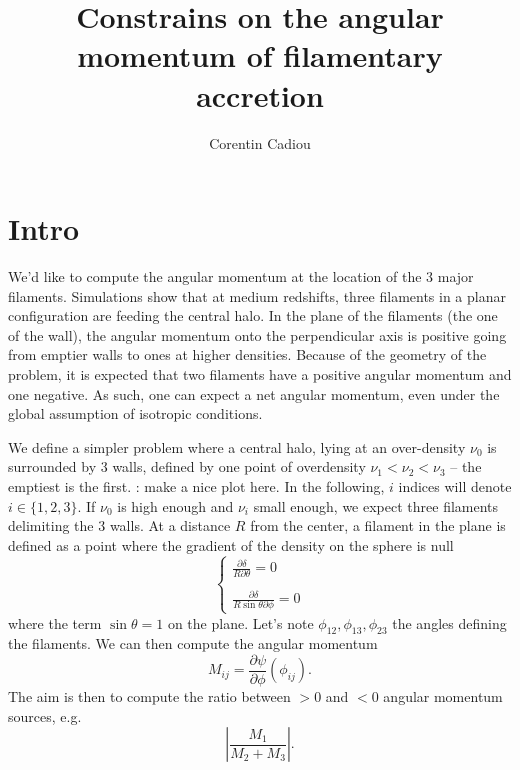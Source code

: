 \documentclass[useAMS,usenatbib,babel,superscriptaddress]{mnras}
\title{Constrains on the angular momentum of filamentary accretion}
\author{Corentin Cadiou}
\def\red{\color{Red}}
\newcommand{\TODO}[1]{{\red{\bf TODO}: #1}}
\begin{document}
\maketitle

\section{Intro}
\label{sec:intro}

We'd like to compute the angular momentum at the location of the 3 major filaments. Simulations show that at medium redshifts, three filaments in a planar configuration are feeding the central halo. In the plane of the filaments (the one of the wall), the angular momentum onto the perpendicular axis is positive going from emptier walls to ones at higher densities. Because of the geometry of the problem, it is expected that two filaments have a positive angular momentum and one negative. As such, one can expect a net angular momentum, even under the global assumption of isotropic conditions.

We define a simpler problem where a central halo, lying at an over-density $\nu_0$ is surrounded by 3 walls, defined by one point of overdensity $\nu_1<\nu_2<\nu_3$ -- the emptiest is the first. \TODO{make a nice plot here}. In the following, $i$ indices will denote $i\in \{1,2,3\}$. If $\nu_0$ is high enough and $\nu_i$ small enough, we expect three filaments delimiting the 3 walls. At a distance $R$ from the center, a filament in the plane is defined as a point where the gradient of the density on the sphere is null
\begin{equation}
  \left\lbrace
    \begin{matrix}
      \displaystyle\frac{\partial \delta}{R\partial \theta} = 0 \\ \\
      \displaystyle\frac{\partial \delta}{R \sin\theta \partial \phi} = 0
  \end{matrix}
  \right.
\end{equation}
where the term $\sin\theta = 1$ on the plane. Let's note $\phi_{12}, \phi_{13}, \phi_{23}$ the angles defining the filaments. We can then compute the angular momentum
\begin{equation}
  M_{ij} = \frac{\partial \psi}{\partial \phi}(\phi_{ij}).
\end{equation}
The aim is then to compute the ratio between $>0$ and $<0$ angular momentum sources, e.g.
\begin{equation}
  \left|\frac{M_1}{M_2 + M_3} \right|.
\end{equation}
\end{document}
